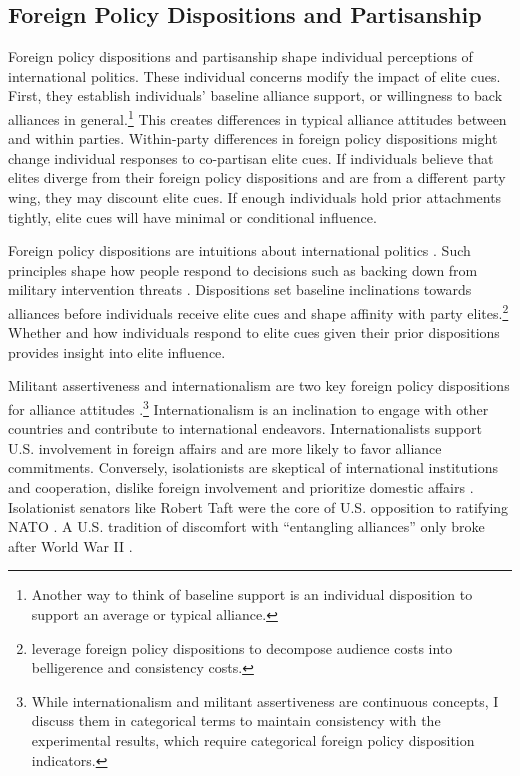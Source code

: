 \documentclass[12pt]{article}
\begin{document}
\subsection{Foreign Policy Dispositions and Partisanship}


Foreign policy dispositions and partisanship shape individual perceptions of international politics. 
These individual concerns modify the impact of elite cues. 
First, they establish individuals' baseline alliance support, or willingness to back alliances in general.\footnote{Another way to think of baseline support is an individual disposition to support an average or typical alliance.} 
This creates differences in typical alliance attitudes between and within parties.
Within-party differences in foreign policy dispositions might change individual responses to co-partisan elite cues.
If individuals believe that elites diverge from their foreign policy dispositions and are from a different party wing, they may discount elite cues.  
If enough individuals hold prior attachments tightly, elite cues will have minimal or conditional influence.


Foreign policy dispositions are intuitions about international politics \citep{KertzerTingley2018}. 
Such principles shape how people respond to decisions such as backing down from military intervention threats \citep{KertzerBrutger2016}. 
Dispositions set baseline inclinations towards alliances before individuals receive elite cues and shape affinity with party elites.\footnote{\citet{KertzerBrutger2016} leverage foreign policy dispositions to decompose audience costs into belligerence and consistency costs.}
Whether and how individuals respond to elite cues given their prior dispositions provides insight into elite influence. 


Militant assertiveness and internationalism are two key foreign policy dispositions for alliance attitudes \citep{Herrmannetal1999}.\footnote{While internationalism and militant assertiveness are continuous concepts, I discuss them in categorical terms to maintain consistency with the experimental results, which require categorical foreign policy disposition indicators.}
Internationalism is an inclination to engage with other countries and contribute to international endeavors. 
Internationalists support U.S. involvement in foreign affairs and are more likely to favor alliance commitments. 
Conversely, isolationists are skeptical of international institutions and cooperation, dislike foreign involvement and prioritize domestic affairs \citep{Kertzer2013}. 
Isolationist senators like Robert Taft were the core of U.S. opposition to ratifying NATO \citep{Kaplan2007}.
A U.S. tradition of discomfort with ``entangling alliances'' only broke after World War II \citep{Kupchan2020}.
\end{document}
